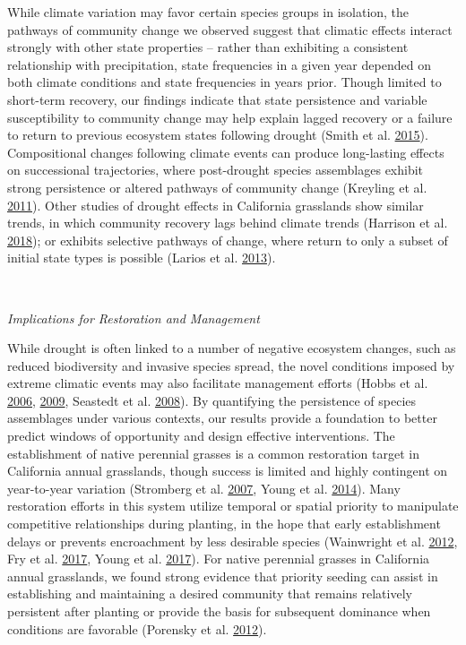 \documentclass[twoside,12pt,final]{ucthesis-CA2012}
\begin{document}
\begin{ucmainmatter}
While climate variation may favor certain species groups in isolation, the pathways of community change we observed suggest that climatic effects interact strongly with other state properties -- rather than exhibiting a consistent relationship with precipitation, state frequencies in a given year depended on both climate conditions and state frequencies in years prior.
Though limited to short-term recovery, our findings indicate that state persistence and variable susceptibility to community change may help explain lagged recovery or a failure to return to previous ecosystem states following drought (Smith et al. \protect\hyperlink{ref-Smith2015}{2015}).
Compositional changes following climate events can produce long-lasting effects on successional trajectories, where post-drought species assemblages exhibit strong persistence or altered pathways of community change (Kreyling et al. \protect\hyperlink{ref-Kreyling2011}{2011}).
Other studies of drought effects in California grasslands show similar trends, in which community recovery lags behind climate trends (Harrison et al. \protect\hyperlink{ref-Harrison2018}{2018}); or exhibits selective pathways of change, where return to only a subset of initial state types is possible (Larios et al. \protect\hyperlink{ref-Larios2013}{2013}).

~

\emph{Implications for Restoration and Management}

While drought is often linked to a number of negative ecosystem changes, such as reduced biodiversity and invasive species spread, the novel conditions imposed by extreme climatic events may also facilitate management efforts (Hobbs et al. \protect\hyperlink{ref-Hobbs2006}{2006}, \protect\hyperlink{ref-Hobbs2009}{2009}, Seastedt et al. \protect\hyperlink{ref-Seastedt2008}{2008}).
By quantifying the persistence of species assemblages under various contexts, our results provide a foundation to better predict windows of opportunity and design effective interventions.
The establishment of native perennial grasses is a common restoration target in California annual grasslands, though success is limited and highly contingent on year-to-year variation (Stromberg et al. \protect\hyperlink{ref-Stromberg2007}{2007}, Young et al. \protect\hyperlink{ref-Young2014}{2014}).
Many restoration efforts in this system utilize temporal or spatial priority to manipulate competitive relationships during planting, in the hope that early establishment delays or prevents encroachment by less desirable species (Wainwright et al. \protect\hyperlink{ref-Wainwright2012}{2012}, Fry et al. \protect\hyperlink{ref-Fry2017}{2017}, Young et al. \protect\hyperlink{ref-Young2017}{2017}).
For native perennial grasses in California annual grasslands, we found strong evidence that priority seeding can assist in establishing and maintaining a desired community that remains relatively persistent after planting or provide the basis for subsequent dominance when conditions are favorable (Porensky et al. \protect\hyperlink{ref-Porensky2012}{2012}).


\end{ucmainmatter}
\end{document}
